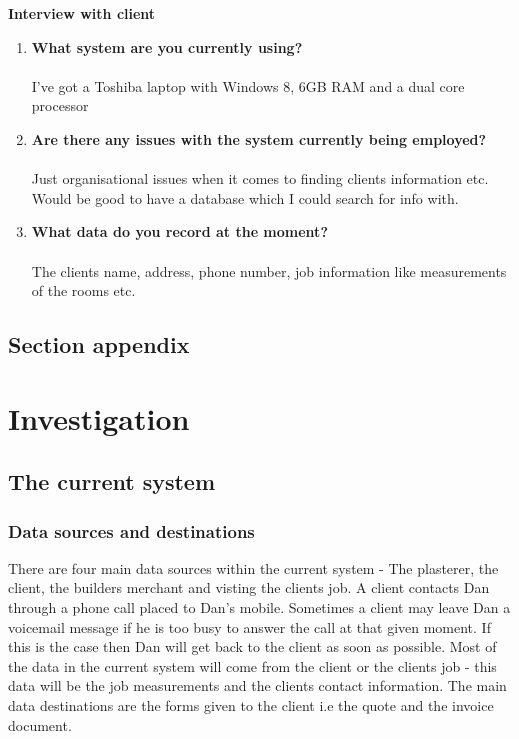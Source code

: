 \begin{flushleft}
	\textbf{Interview with client}
\end{flushleft}


\begin{enumerate}
	\item \textbf{What system are you currently using?}
		\\ \\ I've got a Toshiba laptop with Windows 8, 6GB RAM and a dual core processor
	\item \textbf{Are there any issues with the system currently being employed?}
		\\ \\Just organisational issues when it comes to finding clients information etc. Would be good to have a database which I could search for info with.
	\item \textbf{What data do you record at the moment?}
		\\ \\ The clients name, address, phone number, job information like measurements of the rooms etc.
\end{enumerate}


\subsection{Section appendix}

\section{Investigation}

\subsection{The current system}





\subsubsection{Data sources and destinations}


\begin{flushleft}
	There are four main data sources within the current system - The plasterer, the client, the builders merchant and visting the clients job. A client contacts Dan through a phone call placed to Dan's mobile. Sometimes a client may leave Dan a voicemail message if he is too busy to answer the call at that given moment. If this is the case then Dan will get back to the client as soon as possible. Most of the data in the current system will come from the client or the clients job - this data will be the job measurements and the clients contact information. The main data destinations are the forms given to the client i.e the quote and the invoice document.

\end{flushleft}

